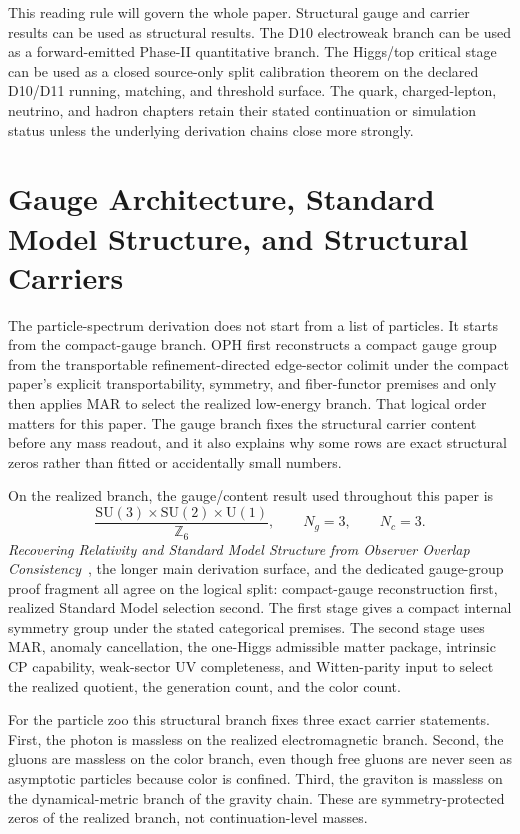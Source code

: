 \documentclass[11pt]{article}
\newcommand{\SU}{\mathrm{SU}}
\newcommand{\U}{\mathrm{U}}
\begin{document}
This reading rule will govern the whole paper. Structural gauge and carrier results can be used
as structural results. The D10 electroweak branch can be used as a forward-emitted Phase-II
quantitative branch. The
Higgs/top critical stage can be used as a closed source-only split calibration theorem on the declared D10/D11 running, matching, and threshold surface. The quark,
charged-lepton, neutrino, and hadron chapters retain their stated continuation or
simulation status unless the underlying derivation chains close more strongly.

\section{Gauge Architecture, Standard Model Structure, and Structural Carriers}

The particle-spectrum derivation does not start from a list of particles. It starts from the
compact-gauge branch. OPH first reconstructs a compact gauge
group from the transportable refinement-directed edge-sector colimit under the compact paper's
explicit transportability, symmetry, and fiber-functor premises and only then applies MAR to
select the realized low-energy branch. That logical order matters for this paper. The
gauge branch fixes the structural carrier content before any mass readout, and it also explains
why some rows are exact structural zeros rather than fitted or accidentally small numbers.

On the realized branch, the gauge/content result used throughout this paper is
\[
\frac{\SU(3)\times\SU(2)\times\U(1)}{\mathbb Z_6},
\qquad
N_g=3,
\qquad
N_c=3.
\]
\emph{Recovering Relativity and Standard Model Structure from Observer Overlap Consistency}~\cite{ophcompact}, the longer main derivation surface, and the dedicated gauge-group proof
fragment all agree on the logical split: compact-gauge reconstruction first, realized Standard
Model selection second. The first stage gives a compact internal symmetry group under the stated
categorical premises. The second stage uses MAR, anomaly cancellation, the one-Higgs admissible
matter package, intrinsic CP capability, weak-sector UV completeness, and Witten-parity input to
select the realized quotient, the generation count, and the color count.

For the particle zoo this structural branch fixes three exact carrier statements.
First, the photon is massless on the realized electromagnetic branch. Second, the gluons are
massless on the color branch, even though free gluons are never seen as asymptotic particles
because color is confined. Third, the graviton is massless on the dynamical-metric branch of the
gravity chain. These are symmetry-protected zeros of the realized branch, not continuation-level
masses.
\end{document}
